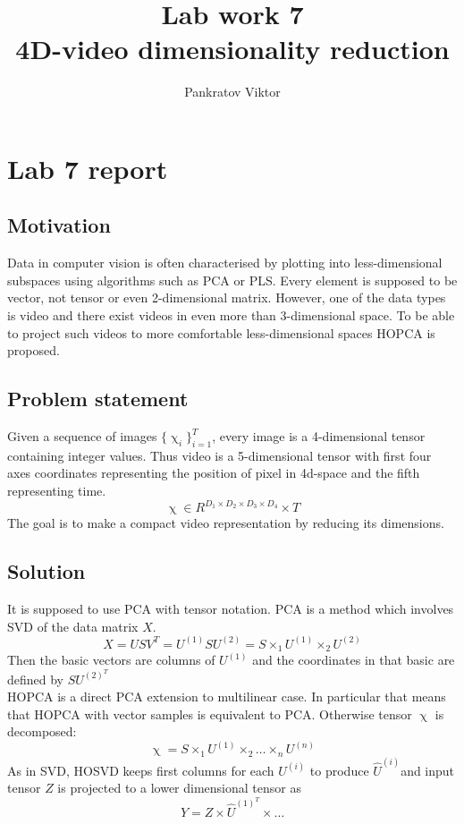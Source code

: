 \documentclass[12pt]{article}
\title{Lab work 7\\ 4D-video dimensionality reduction}
\date{}
\author{Pankratov Viktor}
\begin{document}
\maketitle
{}
\tableofcontents
\newpage
\section{Lab 7 report}

\subsection{Motivation}
Data in computer vision is often characterised by plotting into less-dimensional subspaces using algorithms such as PCA or PLS. Every element is supposed to be vector, not tensor or even 2-dimensional matrix. However, one of the data types is video and there exist videos in even more than 3-dimensional space. To be able to project such videos to more comfortable less-dimensional spaces HOPCA is proposed.
\subsection{Problem statement}
Given a sequence of images $\{\upchi_i\}_{i=1}^{T}$, every image is a 4-dimensional tensor containing integer values. Thus video is a 5-dimensional tensor with first four axes coordinates representing the position of pixel in 4d-space and the fifth representing time.
$$\upchi \in R^{D_1 \times D_2 \times D_3 \times D_4} \times T $$ The goal is to make a compact video representation by reducing its dimensions.
\subsection{Solution}
It is supposed to use PCA with tensor notation. PCA is a method which involves SVD of the data matrix $X$.
$$X = USV^T = U^{(1)}SU^{(2)} = S \times_1 U^{(1)} \times_2 U^{(2)}$$
Then the basic vectors are columns of $U^{(1)}$ and the coordinates in that basic are defined by $SU^{(2)^T}$ \\
HOPCA is a direct PCA extension to multilinear case. In particular that means that HOPCA with vector samples is equivalent to PCA. Otherwise tensor $\upchi$ is decomposed:
$$\upchi = S \times_1 U^{(1)} \times_2 \dots \times_n U^{(n)} $$ 
As in SVD, HOSVD keeps first columns for each $U^{(i)}$ to produce $\hat{U}^{(i)}$and input tensor $Z$ is projected to a lower dimensional tensor as
$$Y = Z \times \hat{U}^{(1)^T} \times \dots$$
\end{document}
